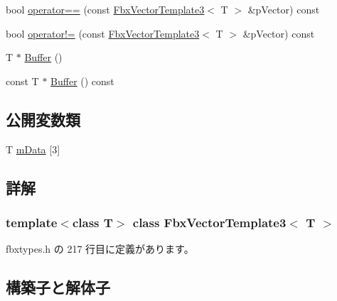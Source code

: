 \begin{DoxyCompactItemize}
\item 
bool \hyperlink{class_fbx_vector_template3_aed608afc6dbe8e27447be99120546582}{operator==} (const \hyperlink{class_fbx_vector_template3}{Fbx\+Vector\+Template3}$<$ T $>$ \&p\+Vector) const
\item 
bool \hyperlink{class_fbx_vector_template3_acf6fb2023f555ec2912566031918aa31}{operator!=} (const \hyperlink{class_fbx_vector_template3}{Fbx\+Vector\+Template3}$<$ T $>$ \&p\+Vector) const
\item 
T $\ast$ \hyperlink{class_fbx_vector_template3_abff5302d7b86d9ae65615839bfb4458b}{Buffer} ()
\item 
const T $\ast$ \hyperlink{class_fbx_vector_template3_ae5a5582d606a687f346f470d94ff551d}{Buffer} () const
\end{DoxyCompactItemize}
\subsection*{公開変数類}
\begin{DoxyCompactItemize}
\item 
T \hyperlink{class_fbx_vector_template3_a63f8316f392b536de41dfaa2031a2d54}{m\+Data} \mbox{[}3\mbox{]}
\end{DoxyCompactItemize}


\subsection{詳解}
\subsubsection*{template$<$class T$>$\newline
class Fbx\+Vector\+Template3$<$ T $>$}



 fbxtypes.\+h の 217 行目に定義があります。



\subsection{構築子と解体子}
\mbox{\label{class_fbx_vector_template3_a3a0d3989e58b800da934f7810410ea9a}} 
